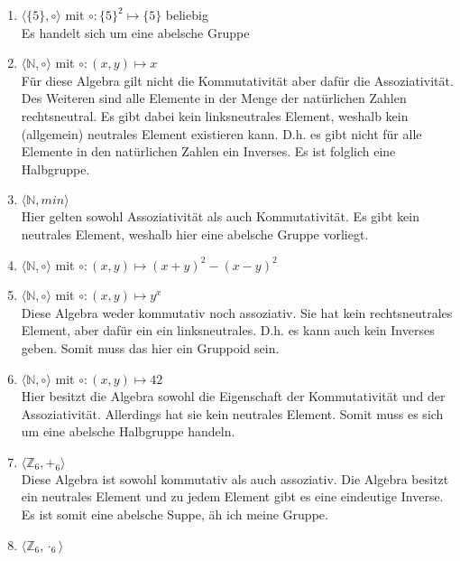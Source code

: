     \begin{enumerate}[label=(\alph*)]
        \item $\langle \{5\}, \circ \rangle$ mit $\circ : \{5\}^2 \mapsto \{5\} $ beliebig \\
        Es handelt sich um eine abelsche Gruppe
        \item $\langle \mathbb{N}, \circ \rangle$ mit $\circ : (x,y) \mapsto x $ \\
        Für diese Algebra gilt nicht die Kommutativität aber dafür die Assoziativität. Des Weiteren sind alle Elemente in der Menge der natürlichen Zahlen rechtsneutral. Es gibt dabei kein linksneutrales Element, weshalb kein (allgemein) neutrales Element existieren kann. D.h. es gibt nicht für alle Elemente in den natürlichen Zahlen ein Inverses. Es ist folglich eine Halbgruppe.
        \item $\langle \mathbb{N}, min \rangle$\\ 
        Hier gelten sowohl Assoziativität als auch Kommutativität. Es gibt kein neutrales Element, weshalb hier eine abelsche Gruppe vorliegt.
        \item $\langle \mathbb{N}, \circ \rangle$ mit $\circ : (x,y) \mapsto (x+y)^2 - (x-y)^2  $
        \item $\langle \mathbb{N}, \circ \rangle$ mit $\circ : (x,y) \mapsto y^x $ \\
        Diese Algebra weder kommutativ noch assoziativ. Sie hat kein rechtsneutrales Element, aber dafür ein ein linksneutrales. D.h. es kann auch kein Inverses geben. Somit muss das hier ein Gruppoid sein.
        \item $\langle \mathbb{N}, \circ \rangle$ mit $\circ : (x,y) \mapsto 42 $ \\
        Hier besitzt die Algebra sowohl die Eigenschaft der Kommutativität und der  Assoziativität. Allerdings hat sie kein neutrales Element. Somit muss es sich um eine abelsche Halbgruppe handeln.
        \item $\langle \mathbb{Z}_6, {+}_6 \rangle$ \\
        Diese Algebra ist sowohl kommutativ als auch assoziativ. Die Algebra besitzt ein neutrales Element und zu jedem Element gibt es eine eindeutige Inverse. Es ist somit eine abelsche Suppe, äh ich meine Gruppe. %
        \item $\langle \mathbb{Z}_6, {\cdot}_6 \rangle$ \\

\end{enumerate}
